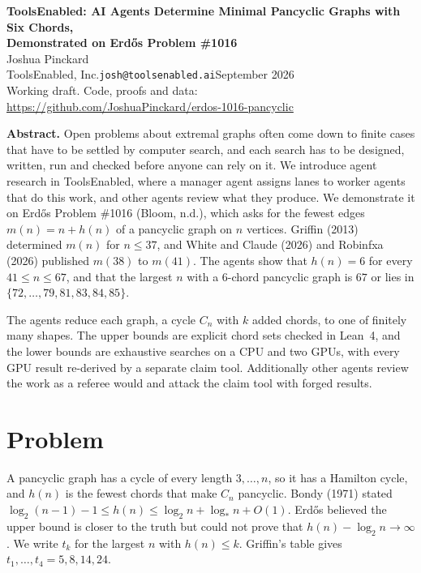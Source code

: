 \documentclass[10pt]{article}
\begin{document}
\begin{center}
{\large\bfseries ToolsEnabled: AI Agents Determine Minimal Pancyclic Graphs with Six Chords,\\[1pt]
Demonstrated on Erd\H{o}s Problem \#1016}\\[3pt]
Joshua Pinckard\\[1pt]
ToolsEnabled, Inc.\quad\texttt{josh@toolsenabled.ai}\quad September 2026\\[1pt]
{\small Working draft. Code, proofs and data: \url{https://github.com/JoshuaPinckard/erdos-1016-pancyclic}}
\end{center}
\vspace{-0.8ex}

\textbf{Abstract.}
Open problems about extremal graphs often come down to finite cases that have to be settled by computer search, and each search has to be designed, written, run and checked before anyone can rely on it. We introduce agent research in ToolsEnabled, where a manager agent assigns lanes to worker agents that do this work, and other agents review what they produce. We demonstrate it on Erd\H{o}s Problem \#1016 (Bloom, n.d.), which asks for the fewest edges $m(n)=n+h(n)$ of a pancyclic graph on $n$ vertices. Griffin (2013) determined $m(n)$ for $n\le37$, and White and Claude (2026) and Robinfxa (2026) published $m(38)$ to $m(41)$. The agents show that $h(n)=6$ for every $41\le n\le67$, and that the largest $n$ with a 6-chord pancyclic graph is $67$ or lies in $\{72,\dots,79,81,83,84,85\}$.

The agents reduce each graph, a cycle $C_n$ with $k$ added chords, to one of finitely many shapes. The upper bounds are explicit chord sets checked in Lean~4, and the lower bounds are exhaustive searches on a CPU and two GPUs, with every GPU result re-derived by a separate claim tool. Additionally other agents review the work as a referee would and attack the claim tool with forged results.

\section{Problem}
A pancyclic graph has a cycle of every length $3,\dots,n$, so it has a Hamilton cycle, and $h(n)$ is the fewest chords that make $C_n$ pancyclic. Bondy (1971) stated $\log_2(n-1)-1\le h(n)\le\log_2 n+\log_* n+O(1)$. Erd\H{o}s believed the upper bound is closer to the truth but could not prove that $h(n)-\log_2 n\to\infty$. We write $t_k$ for the largest $n$ with $h(n)\le k$. Griffin's table gives $t_1,\dots,t_4=5,8,14,24$.
\end{document}
